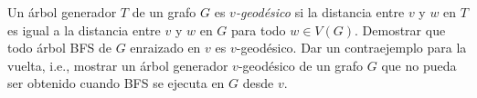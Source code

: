 
 \item\Obligatorio Un árbol generador $T$ de un grafo $G$ es \emph{$v$-geodésico} si la distancia entre $v$ y $w$ en $T$ es igual a la distancia entre $v$ y $w$ en $G$ para todo $w \in V(G)$.  Demostrar que todo árbol BFS de $G$ enraizado en $v$ es $v$-geodésico. Dar un contraejemplo para la vuelta, i.e., mostrar un árbol generador $v$-geodésico de un grafo $G$ que no pueda ser obtenido cuando BFS se ejecuta en $G$ desde $v$.


